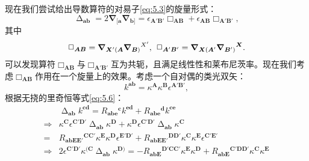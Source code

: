 现在我们尝试给出导数算符的对易子\ref{eq:5.3}的旋量形式：
\begin{equation*}
	\upDelta _{\boldsymbol{ab}} =2\boldsymbol{\nabla }_{[\boldsymbol{a}}\boldsymbol{\nabla }_{\boldsymbol{b}]} =\epsilon _{\boldsymbol{A} '\boldsymbol{B} '} \Box _{\boldsymbol{AB}} +\epsilon _{\boldsymbol{AB}} \Box _{\boldsymbol{A} '\boldsymbol{B} '} ,
\end{equation*}
其中
\begin{equation*}
	\Box _{\boldsymbol{AB}} =\boldsymbol{\nabla }_{\boldsymbol{X} '(\boldsymbol{A}}\boldsymbol{\nabla }{_{\boldsymbol{B})}}^{X'} ,\kern+0.4em \Box _{\boldsymbol{A} '\boldsymbol{B} '} =\boldsymbol{\nabla }_{\boldsymbol{X}(\boldsymbol{A} '}\boldsymbol{\nabla }{_{\boldsymbol{B} ')}}^{\boldsymbol{X}} .
\end{equation*}
可以发现算符$\Box _{\boldsymbol{AB}}$与$\Box _{\boldsymbol{A} '\boldsymbol{B} '}$互为共轭，且满足线性性和莱布尼茨率。现在我们考虑$\Box _{\boldsymbol{AB}}$作用在一个旋量上的效果。考虑一个自对偶的类光双矢：
\begin{equation*}
	k^{\boldsymbol{ab}} =\kappa ^{\boldsymbol{A}} \kappa ^{\boldsymbol{B}} \epsilon ^{\boldsymbol{A} '\boldsymbol{B} '} ,
\end{equation*}
根据无挠的里奇恒等式\ref{eq:5.6}：
\begin{equation*}
	\begin{aligned}
		& \upDelta _{\boldsymbol{ab}} k^{\boldsymbol{cd}} =R{_{\boldsymbol{abe}}}^{\boldsymbol{c}} k^{\boldsymbol{ed}} +R{_{\boldsymbol{abe}}}^{\boldsymbol{d}} k^{\boldsymbol{ce}}\\
		\Rightarrow  & \kappa ^{\boldsymbol{C}} \epsilon ^{\boldsymbol{C} '\boldsymbol{D} '} \upDelta _{\boldsymbol{ab}} \kappa ^{\boldsymbol{D}} +\kappa ^{\boldsymbol{D}} \epsilon ^{\boldsymbol{C} '\boldsymbol{D} '} \upDelta _{\boldsymbol{ab}} \kappa ^{\boldsymbol{C}}\\
		= & R{_{\boldsymbol{abEE} '}}^{\boldsymbol{CC} '} \kappa ^{\boldsymbol{E}} \kappa ^{\boldsymbol{D}} \epsilon ^{\boldsymbol{E} '\boldsymbol{D} '} +R{_{\boldsymbol{abEE} '}}^{\boldsymbol{DD} '} \kappa ^{\boldsymbol{C}} \kappa ^{\boldsymbol{E}} \epsilon ^{\boldsymbol{C} '\boldsymbol{E} '}\\
		\Rightarrow  & 2\epsilon ^{\boldsymbol{C} '\boldsymbol{D} '} \kappa ^{(\boldsymbol{C}} \upDelta _{\boldsymbol{ab}} \kappa ^{\boldsymbol{D})} =-R{_{\boldsymbol{abE}}}^{\boldsymbol{D'CC} '} \kappa ^{\boldsymbol{E}} \kappa ^{\boldsymbol{D}} +R{_{\boldsymbol{abE}}}^{\boldsymbol{C} '\boldsymbol{DD} '} \kappa ^{\boldsymbol{C}} \kappa ^{\boldsymbol{E}}
	\end{aligned}
\end{equation*}
